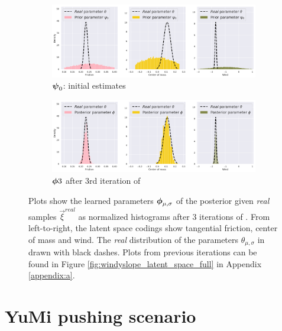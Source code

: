 \begin{figure}[h!]
\centering
\captionsetup{size=footnotesize}
\begin{subfigure}{\linewidth}
  \includegraphics[width=1.0\linewidth]{img/windyslope/latent-representation/latent_encoding_iter0}
  \caption{$\boldsymbol{\psi}_0$: initial estimates}
  \label{fig_3_parameters_0}
\end{subfigure}
\begin{subfigure}{\textwidth}
  \includegraphics[width=1.0\linewidth]{img/windyslope/latent-representation/latent_encoding_iter3}
  \caption{$\boldsymbol{\phi}3$ after 3rd iteration of \dettostoc{}}
\end{subfigure}
\caption{Plots show the learned parameters $\boldsymbol{\phi}_{\mu, \sigma}$ of the posterior given \emph{real} samples $\vec{\xi}^{real}$ as normalized histograms after 3 iterations of \dettostoc{}.
From left-to-right, the latent space codings show tangential friction, center of mass and wind. %
The \emph{real} distribution of the parameters $\theta_{\mu, \sigma}$ in drawn with black dashes. Plots from previous iterations can be found in Figure \ref{fig:windyslope_latent_space_full} in Appendix \ref{appendix:a}.}
\label{fig:windyslope_latent_space}
\end{figure}

\clearpage
\section{YuMi pushing scenario}

